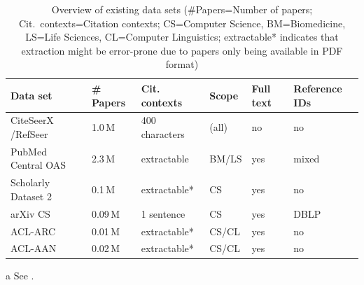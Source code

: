\begin{table}[tb]
 \caption[Overview of existing data sets]{Overview of existing data sets (\#Papers=Number of papers; Cit.\ contexts=Citation contexts; CS=Computer Science, BM=Biomedicine, LS=Life Sciences, CL=Computer Linguistics; extractable* indicates that extraction might be error-prone due to papers only being available in PDF format)}
 \label{tab:existing-data-sets}
  \centering
  \begin{small}
 \begin{threeparttable}
 \begin{tabular}{llllll}
 \toprule
   Data set & \#\,Papers & Cit. contexts & Scope & Full text & Reference IDs \\
   \midrule
   CiteSeerX \cite{Caragea2014}/RefSeer \cite{Huang2015fixed} &  1.0\,M & 400 characters & (all) & no & no \\
   PubMed Central OAS\tnote{a} & 2.3\,M & extractable & BM/LS & yes & mixed \\
   Scholarly Dataset 2 \cite{Sugiyama2015} & 0.1\,M & extractable* & CS & yes & no \\
   arXiv CS \cite{Faerber2018LREC}   &  0.09\,M & 1 sentence & CS & yes & DBLP \\
   ACL-ARC \cite{Bird2008ACLARC} & 0.01\,M & extractable* & CS/CL & yes & no \\
   ACL-AAN \cite{Radev2013} & 0.02\,M & extractable* & CS/CL & yes & no  \\
   \bottomrule
 \end{tabular}
 \begin{tablenotes}
    \item[a] See .
  \end{tablenotes}
\end{threeparttable}
  \end{small}
\end{table}

